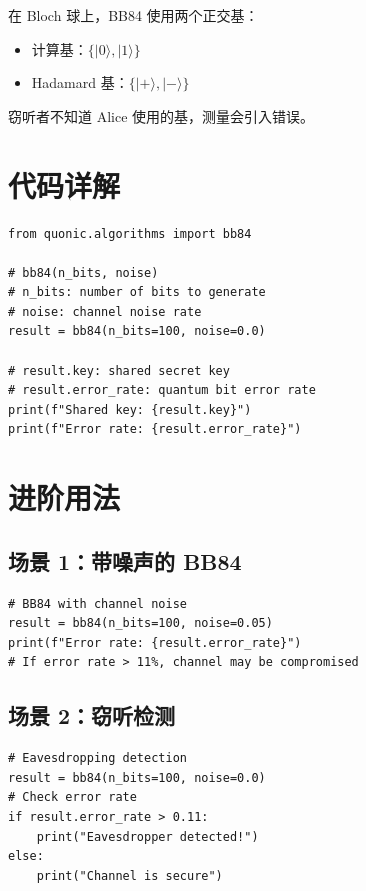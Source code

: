\documentclass[12pt,a4paper]{article}
\begin{document}
在 Bloch 球上，BB84 使用两个正交基：
\begin{itemize}
  \item 计算基：$\{|0\rangle, |1\rangle\}$
  \item Hadamard 基：$\{|+\rangle, |-\rangle\}$
\end{itemize}

窃听者不知道 Alice 使用的基，测量会引入错误。

\section{代码详解}

\begin{lstlisting}[style=python]
from quonic.algorithms import bb84

# bb84(n_bits, noise)
# n_bits: number of bits to generate
# noise: channel noise rate
result = bb84(n_bits=100, noise=0.0)

# result.key: shared secret key
# result.error_rate: quantum bit error rate
print(f"Shared key: {result.key}")
print(f"Error rate: {result.error_rate}")
\end{lstlisting}

\section{进阶用法}

\subsection{场景 1：带噪声的 BB84}

\begin{lstlisting}[style=python]
# BB84 with channel noise
result = bb84(n_bits=100, noise=0.05)
print(f"Error rate: {result.error_rate}")
# If error rate > 11%, channel may be compromised
\end{lstlisting}

\subsection{场景 2：窃听检测}

\begin{lstlisting}[style=python]
# Eavesdropping detection
result = bb84(n_bits=100, noise=0.0)
# Check error rate
if result.error_rate > 0.11:
    print("Eavesdropper detected!")
else:
    print("Channel is secure")
\end{lstlisting}
\end{document}
